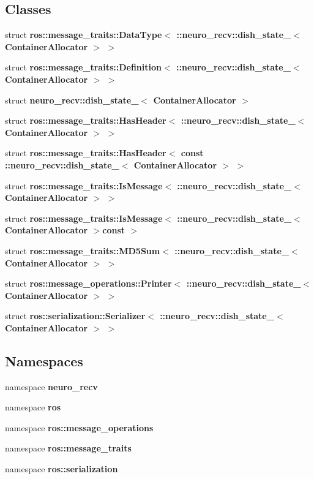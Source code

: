 \subsection*{\-Classes}
\begin{DoxyCompactItemize}
\item 
struct {\bf ros\-::message\-\_\-traits\-::\-Data\-Type$<$ \-::neuro\-\_\-recv\-::dish\-\_\-state\-\_\-$<$ Container\-Allocator $>$ $>$}
\item 
struct {\bf ros\-::message\-\_\-traits\-::\-Definition$<$ \-::neuro\-\_\-recv\-::dish\-\_\-state\-\_\-$<$ Container\-Allocator $>$ $>$}
\item 
struct {\bf neuro\-\_\-recv\-::dish\-\_\-state\-\_\-$<$ Container\-Allocator $>$}
\item 
struct {\bf ros\-::message\-\_\-traits\-::\-Has\-Header$<$ \-::neuro\-\_\-recv\-::dish\-\_\-state\-\_\-$<$ Container\-Allocator $>$ $>$}
\item 
struct {\bf ros\-::message\-\_\-traits\-::\-Has\-Header$<$ const \-::neuro\-\_\-recv\-::dish\-\_\-state\-\_\-$<$ Container\-Allocator $>$ $>$}
\item 
struct {\bf ros\-::message\-\_\-traits\-::\-Is\-Message$<$ \-::neuro\-\_\-recv\-::dish\-\_\-state\-\_\-$<$ Container\-Allocator $>$ $>$}
\item 
struct {\bf ros\-::message\-\_\-traits\-::\-Is\-Message$<$ \-::neuro\-\_\-recv\-::dish\-\_\-state\-\_\-$<$ Container\-Allocator $>$const  $>$}
\item 
struct {\bf ros\-::message\-\_\-traits\-::\-M\-D5\-Sum$<$ \-::neuro\-\_\-recv\-::dish\-\_\-state\-\_\-$<$ Container\-Allocator $>$ $>$}
\item 
struct {\bf ros\-::message\-\_\-operations\-::\-Printer$<$ \-::neuro\-\_\-recv\-::dish\-\_\-state\-\_\-$<$ Container\-Allocator $>$ $>$}
\item 
struct {\bf ros\-::serialization\-::\-Serializer$<$ \-::neuro\-\_\-recv\-::dish\-\_\-state\-\_\-$<$ Container\-Allocator $>$ $>$}
\end{DoxyCompactItemize}
\subsection*{\-Namespaces}
\begin{DoxyCompactItemize}
\item 
namespace {\bf neuro\-\_\-recv}
\item 
namespace {\bf ros}
\item 
namespace {\bf ros\-::message\-\_\-operations}
\item 
namespace {\bf ros\-::message\-\_\-traits}
\item 
namespace {\bf ros\-::serialization}
\end{DoxyCompactItemize}
